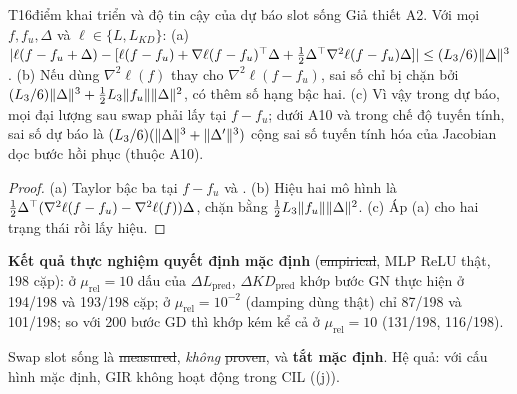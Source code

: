 \begin{namedthm}{T16}{điểm khai triển và độ tin cậy của dự báo slot sống}
Giả thiết A2. Với mọi $f,f_u,\Delta$ và $\ell\in\{L,L_{KD}\}$:
(a) $|\ell(f-f_u+\Delta)-[\ell(f-f_u)+\nabla\ell(f-f_u)^{\top}\Delta+\tfrac12\Delta^{\top}\nabla^2\ell(f-f_u)\Delta]|\le(L_3/6)\lVert \Delta\rVert^3$.
(b) Nếu dùng $\nabla^2\ell(f)$ thay cho $\nabla^2\ell(f-f_u)$, sai số chỉ bị chặn bởi $(L_3/6)\lVert \Delta\rVert^3+\tfrac12L_3\lVert f_u\rVert\lVert \Delta\rVert^2$, có thêm số hạng bậc hai.
(c) Vì vậy trong dự báo, mọi đại lượng sau swap phải lấy tại $f-f_u$; dưới A10 và trong chế độ tuyến tính, sai số dự báo là $(L_3/6)(\lVert \Delta\rVert^3+\lVert \Delta'\rVert^3)$ cộng sai số tuyến tính hóa của Jacobian dọc bước hồi phục (thuộc A10).
\end{namedthm}
\begin{proof}
(a) Taylor bậc ba tại $f-f_u$ và . (b) Hiệu hai mô hình là $\tfrac12\Delta^{\top}(\nabla^2\ell(f-f_u)-\nabla^2\ell(f))\Delta$, chặn bằng $\tfrac12L_3\lVert f_u\rVert\lVert \Delta\rVert^2$. (c) Áp (a) cho hai trạng thái rồi lấy hiệu.
\end{proof}
\noindent\textbf{Kết quả thực nghiệm quyết định mặc định} (\st{empirical}, MLP ReLU thật, 198 cặp): ở $\mu_{\mathrm{rel}}=10$ dấu của $\Delta L_{\mathrm{pred}}$, $\Delta KD_{\mathrm{pred}}$ khớp bước GN thực hiện ở 194/198 và 193/198 cặp; ở $\mu_{\mathrm{rel}}=10^{-2}$ (damping dùng thật) chỉ 87/198 và 101/198; so với 200 bước GD thì khớp kém kể cả ở $\mu_{\mathrm{rel}}=10$ (131/198, 116/198).
\begin{hequa}
Swap slot sống là \st{measured}, \emph{không} \st{proven}, và \textbf{tắt mặc định}. Hệ quả: với cấu hình mặc định, GIR không hoạt động trong CIL ((j)).
\end{hequa}
